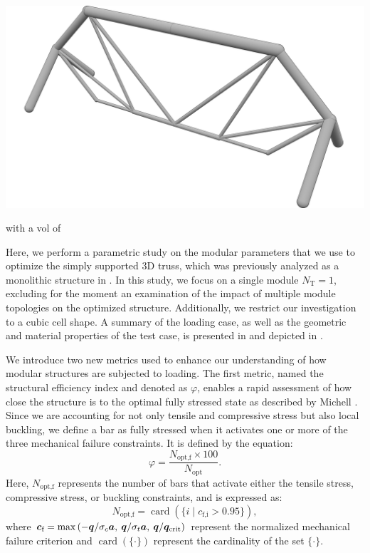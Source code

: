 \begin{marginfigure}
    \centering
    \includegraphics[width=\linewidth]{figures/04_TTO_improvements/16_supported_3D_sol/04_Topology_NLP_iso-min.png}
    \caption{with a vol of}
    \label{fig:05}
\end{marginfigure}
Here, we perform a parametric study on the modular parameters that we use to optimize the simply supported 3D truss, which was previously analyzed as a monolithic structure in . In this study, we focus on a single module $N_\text{T} = 1$, excluding for the moment an examination of the impact of multiple module topologies on the optimized structure. Additionally, we restrict our investigation to a cubic cell shape. A summary of the loading case, as well as the geometric and material properties of the test case, is presented in  and depicted in .

We introduce two new metrics used to enhance our understanding of how modular structures are subjected to loading. The first metric, named the structural efficiency index and denoted as $\varphi$, enables a rapid assessment of how close the structure is to the optimal fully stressed state as described by Michell . Since we are accounting for not only tensile and compressive stress but also local buckling, we define a bar as fully stressed when it activates one or more of the three mechanical failure constraints. It is defined by the equation:
\begin{equation}
    \varphi = \frac{N_\text{opt,f}\times100}{N_\text{opt}}.
\end{equation}
Here, $N_\text{opt,f}$ represents the number of bars that activate either the tensile stress, compressive stress, or buckling constraints, and is expressed as:
\begin{equation}
    N_\text{opt,f} = \operatorname{card}(\{i\;|\;c_\text{f,i} > 0.95\}),
\end{equation}
where $\bm{c}_\text{f}=\max{\left(-\bm{q} /\sigma_c \bm{a},\:\bm{q} /\sigma_t \bm{a},\:\bm{q}/\bm{q}_{\text{crit}}\right)}$ represent the normalized mechanical failure criterion and $\operatorname{card}(\{\cdot\})$ represent the cardinality of the set $\{\cdot\}$.

